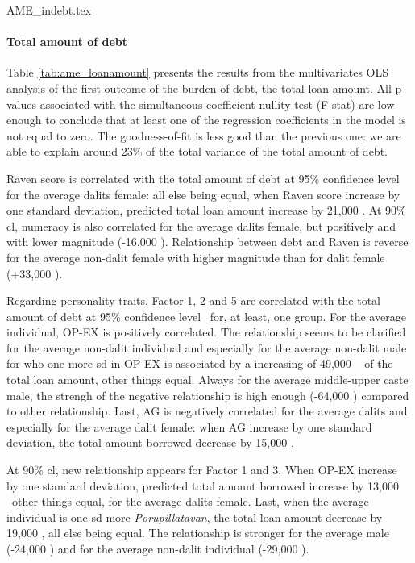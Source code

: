 \documentclass[a4paper, 11pt, onecolumn]{article}
\newcommand{\sd}{standard deviation}
\newcommand{\aebe}{all else being equal}
\newcommand{\ote}{other things equal}
\newcommand{\cl}{confidence level}
\newcommand{\PTCS}{PT\&CS}
\begin{document}
{AME_indebt.tex}


\paragraph{Total amount of debt}
Table \ref{tab:ame_loanamount} presents the results from the multivariates OLS analysis of the first outcome of the burden of debt, the total loan amount.
All p-values associated with the simultaneous coefficient nullity test (F-stat) are low enough to conclude that at least one of the regression coefficients in the model is not equal to zero.
The goodness-of-fit is less good than the previous one: we are able to explain around 23\% of the total variance of the total amount of debt.

Raven score is correlated with the total amount of debt at 95\% \cl~ for the average dalits female: \aebe, when Raven score increase by one \sd, predicted total loan amount increase by 21,000 \rupee.
At 90\% cl, numeracy is also correlated for the average dalits female, but positively and with lower magnitude (-16,000 \rupee).
Relationship between debt and Raven is reverse for the average non-dalit female with higher magnitude than for dalit female (+33,000 \rupee).

Regarding personality traits, Factor 1, 2 and 5 are correlated with the total amount of debt at 95\% \cl~ for, at least, one group.
For the average individual, OP-EX is positively correlated.
The relationship seems to be clarified for the average non-dalit individual and especially for the average non-dalit male for who one more sd in OP-EX is associated by a increasing of 49,000 \rupee~ of the total loan amount, \ote.
Always for the average middle-upper caste male, the strengh of the negative relationship is high enough (-64,000 \rupee) compared to other relationship. 
Last, AG is negatively correlated for the average dalits and especially for the average dalit female: when AG increase by one \sd, the total amount borrowed decrease by 15,000 \rupee.

At 90\% cl, new relationship appears for Factor 1 and 3.
When OP-EX increase by one \sd, predicted total amount borrowed increase by 13,000 \rupee~\ote, for the average dalits female.
Last, when the average individual is one sd more \textit{Porupillatavan}, the total loan amount decrease by 19,000 \rupee, \aebe.
The relationship is stronger for the average male (-24,000 \rupee) and for the average non-dalit individual (-29,000 \rupee).
 
\end{document}
